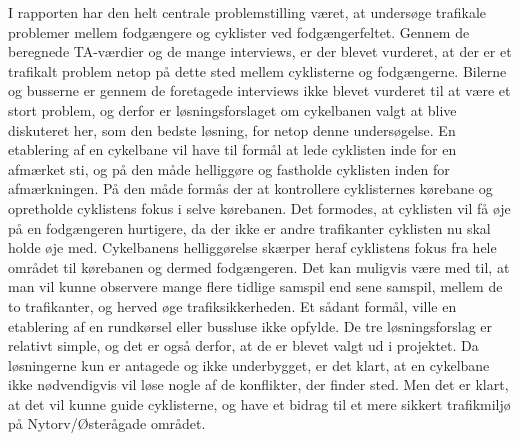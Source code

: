I rapporten har den helt centrale problemstilling været, at undersøge trafikale problemer mellem fodgængere og cyklister ved fodgængerfeltet. Gennem de beregnede TA-værdier og de mange interviews, er der blevet vurderet, at der er et trafikalt problem netop på dette sted mellem cyklisterne og fodgængerne. Bilerne og busserne er gennem de foretagede interviews ikke blevet vurderet til at være et stort problem, og derfor er løsningsforslaget om cykelbanen valgt at blive diskuteret her, som den bedste løsning, for netop denne undersøgelse.
En etablering af en cykelbane vil have til formål at lede cyklisten inde for en afmærket sti, og på den måde helliggøre og fastholde cyklisten inden for afmærkningen. På den måde formås der at kontrollere cyklisternes kørebane og opretholde cyklistens fokus i selve kørebanen. Det formodes, at cyklisten vil få øje på en fodgængeren hurtigere, da der ikke er andre trafikanter cyklisten nu skal holde øje med. Cykelbanens helliggørelse skærper heraf cyklistens fokus fra hele området til kørebanen og dermed fodgængeren. Det kan muligvis være med til, at man vil kunne observere mange flere tidlige samspil end sene samspil, mellem de to trafikanter, og herved øge trafiksikkerheden. Et sådant formål, ville en etablering af en rundkørsel eller bussluse ikke opfylde. De tre løsningsforslag er relativt simple, og det er også derfor, at de er blevet valgt ud i projektet. Da løsningerne kun er antagede og ikke underbygget, er det klart, at en cykelbane ikke nødvendigvis vil løse nogle af de konflikter, der finder sted. Men det er klart, at det vil kunne guide cyklisterne, og have et bidrag til et mere sikkert trafikmiljø på Nytorv/Østerågade området.
